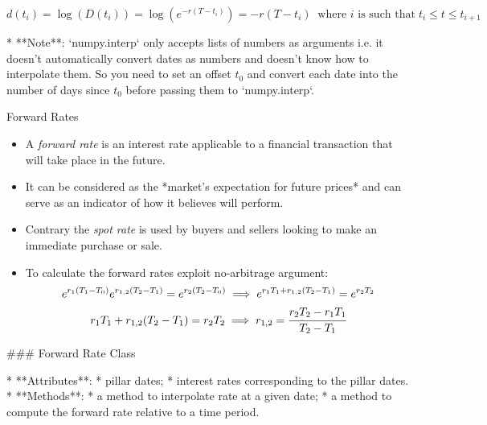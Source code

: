 \documentclass{beamer}
\begin{document}
  $$d(t_i)=\log(D(t_i)) = \log(e^{-r(T-t_i)}) = -r(T-t_i) \;\;\textrm{where $i$ is such that}\;t_i \le t \le t_{i+1}$$

* **Note**: `numpy.interp` only accepts lists of numbers as arguments i.e. it doesn't automatically convert dates as numbers and doesn't know how to interpolate them. So you need to set an offset $t_0$ and convert each date into the number of days since $t_0$ before passing them to `numpy.interp`.

\begin{frame}{Forward Rates}
  \begin{itemize}
  \item A \emph{forward rate} is an interest rate applicable to a financial transaction that will take place in the future.
  \item It can be considered as the *market’s expectation for future prices* and can serve as an indicator of how it believes will perform.
  \item Contrary the \emph{spot rate} is used by buyers and sellers looking to make an immediate purchase or sale.
  \item To calculate the forward rates exploit no-arbitrage argument:
    \begin{equation}
      \begin{gathered}
        e^{r_1 (T_1-T_0)}e^{r_{1,2}(T_2 - T_1)} = e^{r_2 (T_2-T_0)} \implies e^{r_1 T_1 + r_{1,2}(T_2 - T_1)} = e^{r_2 T_2} \\
        r_1 T_1 + r_{1,2}(T_2 - T_1) = r_2 T_2 \implies r_{1,2} = \cfrac{r_2 T_2 - r_1 T_1 }{T_2 - T_1}
      \end{gathered}
    \end{equation}
  \end{itemize}
\end{frame}

### Forward Rate Class

* **Attributes**: 
  * pillar dates;
  * interest rates corresponding to the pillar dates.
* **Methods**:
  * a method to interpolate rate at a given date; 
  * a method to compute the forward rate relative to a time period.
\end{document}
